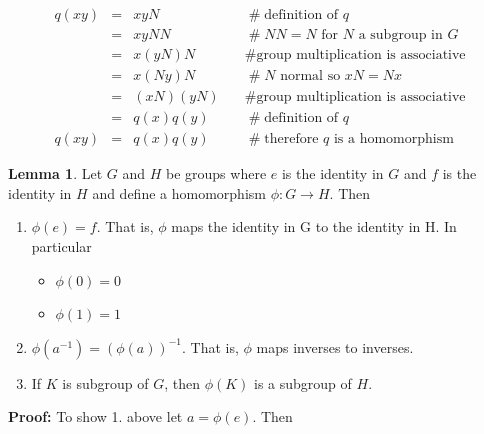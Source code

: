 \documentclass[11pt, oneside]{article}   	%
\theoremstyle{definition}
\newtheorem{lemma}{Lemma}[section]
\begin{document}
\begin{equation*}
\begin{array}{rcll}
q(xy) 
&=& xyN                     &\quad \mathrel{\#} \text{definition of $q$}   \\
&=& xyNN                  &\quad \mathrel{\#} NN =N \text{ for $N$ a subgroup in $G$} \\
&=& x (yN) N              &\quad \mathrel{\#} \text{group multiplication is associative} \\
&=& x (Ny) N              &\quad \mathrel{\#} \text{$N$ normal so  $xN = Nx$} \\
&=& (xN)(yN)              &\quad \mathrel{\#} \text{group multiplication is associative} \\
&=& q(x) q(y)              &\quad \mathrel{\#} \text{definition of $q$}          \\
q(xy) &=& q(x) q(y)     &\quad \mathrel{\#} \text{therefore $q$ is a homomorphism} 
\end{array}
\end{equation*}


\bigskip
\begin{lemma}
Let $G$ and $H$ be groups where $e$ is the identity in $G$ and $f$ is the identity in $H$ and define a homomorphism $\phi: G \rightarrow H$. Then
\begin{enumerate}
\item $\phi(e) = f$. That is,  $\phi$ maps the identity in G to the identity in H. In particular
   \begin{itemize}
     \item $\phi(0) = 0$
     \item $\phi(1) = 1$
    \end{itemize}
\item $\phi(a^{-1}) = (\phi(a))^{-1}$. That is, $\phi$ maps inverses to inverses.
\item If $K$ is subgroup of $G$, then $\phi(K)$ is a subgroup of $H$.
\end{enumerate}
\end{lemma}

\bigskip
\noindent
\textbf{Proof:} To show 1. above let $a = \phi(e)$. Then
\end{document}
